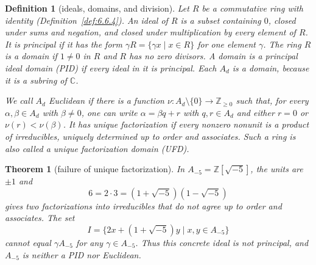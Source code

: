 \documentclass[11pt]{article}
\theoremstyle{ntstyle}
\newtheorem{theorem}{Theorem}[subsection]
\newtheorem{definition}{Definition}[subsection]
\begin{document}
\begin{definition}[ideals, domains, and division]\label{def:8.7.2}
	Let $R$ be a commutative ring with identity
	(Definition~\ref{def:6.6.4}). An ideal of $R$ is a subset containing
	$0$, closed under sums and negation, and closed under multiplication
	by every element of $R$. It is principal if it has the form
	$\gamma R=\{\gamma x\mid x\in R\}$ for one element $\gamma$.
	The ring $R$ is a domain if $1\neq0$ in $R$ and $R$ has no zero
	divisors. A domain is a principal ideal domain (PID) if every ideal
	in it is principal. Each $A_d$ is a domain, because it is a subring
	of $\mathbb{C}$.

	We call $A_d$ Euclidean if there is a function
	$\nu:A_d\setminus\{0\}\to\mathbb{Z}_{\ge0}$ such that, for
	every $\alpha,\beta\in A_d$ with $\beta\neq0$, one can write
	$\alpha=\beta q+r$ with $q,r\in A_d$ and either $r=0$ or
	$\nu(r)<\nu(\beta)$.
	It has unique factorization if every nonzero nonunit is a product
	of irreducibles, uniquely determined up to order and associates. Such a ring
	is also called a unique factorization domain (UFD).
\end{definition}

\begin{theorem}[failure of unique factorization]\label{thm:8.7.2}
	In $A_{-5}=\mathbb{Z}[\sqrt{-5}]$, the units are $\pm1$ and
	\[
		6=2\cdot3=(1+\sqrt{-5})(1-\sqrt{-5})
	\]
	gives two factorizations into irreducibles that do not agree up to
	order and associates. The set
	\[
		I=\{2x+(1+\sqrt{-5})y\mid x,y\in A_{-5}\}
	\]
	cannot equal $\gamma A_{-5}$ for any $\gamma\in A_{-5}$.
	Thus this concrete ideal is not principal, and $A_{-5}$ is neither
	a PID nor Euclidean.
\end{theorem}
\end{document}
